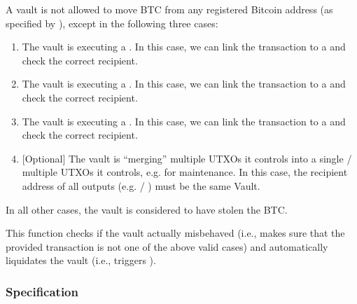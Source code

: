 \documentclass[a4paper,10pt,english]{sphinxmanual}
\begin{document}
A vault is not allowed to move BTC from any registered Bitcoin address (as specified by ), except in the following three cases:
\begin{enumerate}
%
\item {} 
The vault is executing a {\hyperref[\detokenize{spec/redeem:redeem-protocol}]{}}. In this case, we can link the transaction to a  and check the correct recipient.

\item {} 
The vault is executing a {\hyperref[\detokenize{spec/replace:replace-protocol}]{}}. In this case, we can link the transaction to a  and check the correct recipient.

\item {} 
The vault is executing a {\hyperref[\detokenize{spec/refund:refund-protocol}]{}}. In this case, we can link the transaction to a  and check the correct recipient.

\item {} 
{[}Optional{]} The vault is “merging” multiple UTXOs it controls into a single / multiple UTXOs it controls, e.g. for maintenance. In this case, the recipient address of all outputs (e.g.  / ) must be the same Vault.

\end{enumerate}

In all other cases, the vault is considered to have stolen the BTC.

This function checks if the vault actually misbehaved (i.e., makes sure that the provided transaction is not one of the above valid cases) and automatically liquidates the vault (i.e., triggers {\hyperref[\detokenize{spec/redeem:redeem-protocol}]{}}).


\subsubsection{Specification}
\label{\detokenize{spec/staked-relayers:id11}}

\end{document}
